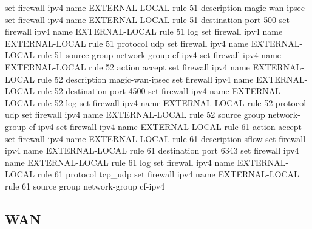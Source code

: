 \documentclass[
]{article}
\newenvironment{Shaded}{\begin{snugshade}}{\end{snugshade}}
\newcommand{\BuiltInTok}[1]{#1}
\newcommand{\NormalTok}[1]{#1}
\newcommand{\StringTok}[1]{\textcolor[rgb]{0.31,0.60,0.02}{#1}}
\begin{document}
\begin{Shaded}
\begin{Highlighting}[numbers=left,,]
\BuiltInTok{set}\NormalTok{ firewall ipv4 name EXTERNAL{-}LOCAL rule 51 description }\StringTok{\textquotesingle{}magic{-}wan{-}ipsec\textquotesingle{}}
\BuiltInTok{set}\NormalTok{ firewall ipv4 name EXTERNAL{-}LOCAL rule 51 destination port }\StringTok{\textquotesingle{}500\textquotesingle{}}
\BuiltInTok{set}\NormalTok{ firewall ipv4 name EXTERNAL{-}LOCAL rule 51 log}
\BuiltInTok{set}\NormalTok{ firewall ipv4 name EXTERNAL{-}LOCAL rule 51 protocol }\StringTok{\textquotesingle{}udp\textquotesingle{}}
\BuiltInTok{set}\NormalTok{ firewall ipv4 name EXTERNAL{-}LOCAL rule 51 source group network{-}group }\StringTok{\textquotesingle{}cf{-}ipv4\textquotesingle{}}
\BuiltInTok{set}\NormalTok{ firewall ipv4 name EXTERNAL{-}LOCAL rule 52 action }\StringTok{\textquotesingle{}accept\textquotesingle{}}
\BuiltInTok{set}\NormalTok{ firewall ipv4 name EXTERNAL{-}LOCAL rule 52 description }\StringTok{\textquotesingle{}magic{-}wan{-}ipsec\textquotesingle{}}
\BuiltInTok{set}\NormalTok{ firewall ipv4 name EXTERNAL{-}LOCAL rule 52 destination port }\StringTok{\textquotesingle{}4500\textquotesingle{}}
\BuiltInTok{set}\NormalTok{ firewall ipv4 name EXTERNAL{-}LOCAL rule 52 log}
\BuiltInTok{set}\NormalTok{ firewall ipv4 name EXTERNAL{-}LOCAL rule 52 protocol }\StringTok{\textquotesingle{}udp\textquotesingle{}}
\BuiltInTok{set}\NormalTok{ firewall ipv4 name EXTERNAL{-}LOCAL rule 52 source group network{-}group }\StringTok{\textquotesingle{}cf{-}ipv4\textquotesingle{}}
\BuiltInTok{set}\NormalTok{ firewall ipv4 name EXTERNAL{-}LOCAL rule 61 action }\StringTok{\textquotesingle{}accept\textquotesingle{}}
\BuiltInTok{set}\NormalTok{ firewall ipv4 name EXTERNAL{-}LOCAL rule 61 description }\StringTok{\textquotesingle{}sflow\textquotesingle{}}
\BuiltInTok{set}\NormalTok{ firewall ipv4 name EXTERNAL{-}LOCAL rule 61 destination port }\StringTok{\textquotesingle{}6343\textquotesingle{}}
\BuiltInTok{set}\NormalTok{ firewall ipv4 name EXTERNAL{-}LOCAL rule 61 log}
\BuiltInTok{set}\NormalTok{ firewall ipv4 name EXTERNAL{-}LOCAL rule 61 protocol }\StringTok{\textquotesingle{}tcp\_udp\textquotesingle{}}
\BuiltInTok{set}\NormalTok{ firewall ipv4 name EXTERNAL{-}LOCAL rule 61 source group network{-}group }\StringTok{\textquotesingle{}cf{-}ipv4\textquotesingle{}}
\end{Highlighting}
\end{Shaded}

\newpage{}

\subsection{WAN}\label{wan}
\end{document}
